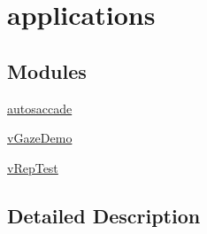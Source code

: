\hypertarget{group__applications}{}\section{applications}
\label{group__applications}
\subsection*{Modules}
\begin{DoxyCompactItemize}
\item 
\hyperlink{group__autosaccade}{autosaccade}
\item 
\hyperlink{group__vGazeDemo}{v\+Gaze\+Demo}
\item 
\hyperlink{group__vRepTest}{v\+Rep\+Test}
\end{DoxyCompactItemize}


\subsection{Detailed Description}
